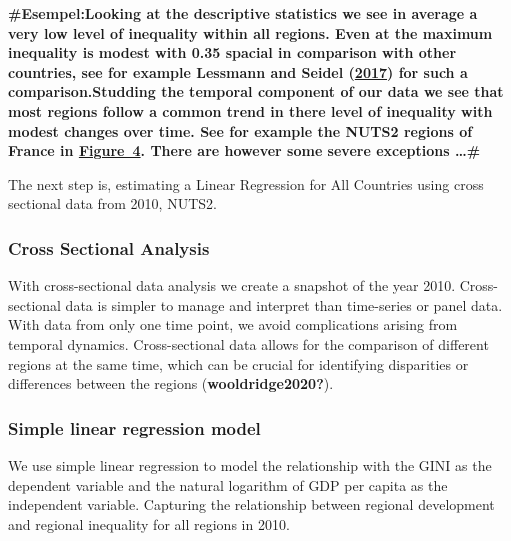 \documentclass[
  a4paper,
  DIV=11,
  numbers=noendperiod]{scrartcl}
\begin{document}
\textbf{\#Esempel:Looking at the descriptive statistics we see in
average a very low level of inequality within all regions. Even at the
maximum inequality is modest with 0.35 spacial in comparison with other
countries, see for example Lessmann and Seidel
(\href{https://a10747-2033066.cluster215.canvas-user-content.com/courses/10747~22507/files/10747~2033066/course\%20files/html/Assignments_example.html?context_id=10747~22507\&context_type=Course\&download=1\&id=107470000002033066\&inline=1\#ref-lessmann2017regional}{2017})
for such a comparison.Studding the temporal component of our data we see
that most regions follow a common trend in there level of inequality
with modest changes over time. See for example the NUTS2 regions of
France in
\href{https://a10747-2033066.cluster215.canvas-user-content.com/courses/10747~22507/files/10747~2033066/course\%20files/html/Assignments_example.html?context_id=10747~22507\&context_type=Course\&download=1\&id=107470000002033066\&inline=1\#fig-regional_gini_time}{Figure~4}.
There are however some severe exceptions \ldots\#}

The next step is, estimating a Linear Regression for All Countries using
cross sectional data from 2010, NUTS2.

\hypertarget{cross-sectional-analysis-1}{%
\subsubsection{\texorpdfstring{\textbf{Cross Sectional
Analysis}}{Cross Sectional Analysis}}\label{cross-sectional-analysis-1}}

With cross-sectional data analysis we create a snapshot of the year
2010. Cross-sectional data is simpler to manage and interpret than
time-series or panel data. With data from only one time point, we avoid
complications arising from temporal dynamics. Cross-sectional data
allows for the comparison of different regions at the same time, which
can be crucial for identifying disparities or differences between the
regions (\textbf{wooldridge2020?}).

\hypertarget{simple-linear-regression-model}{%
\subsubsection{\texorpdfstring{\textbf{Simple linear regression
model}}{Simple linear regression model}}\label{simple-linear-regression-model}}

We use simple linear regression to model the relationship with the GINI
as the dependent variable and the natural logarithm of GDP per capita as
the independent variable. Capturing the relationship between regional
development and regional inequality for all regions in 2010.
\end{document}
